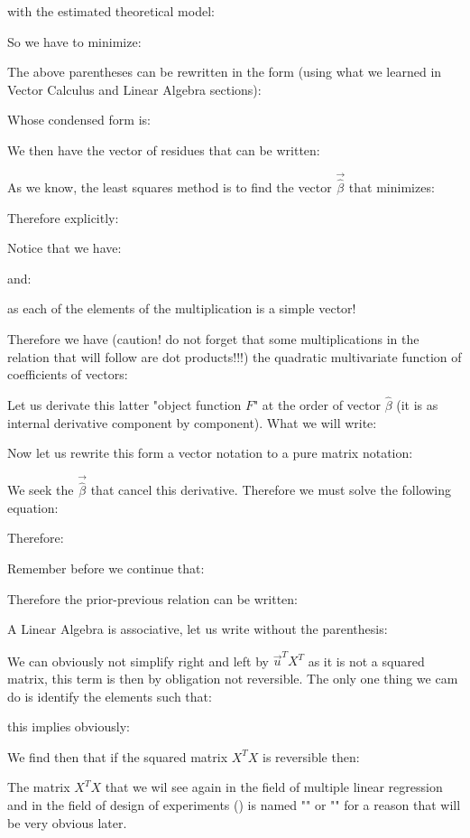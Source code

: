 	with the estimated theoretical model:
	
	So we have to minimize:
	
	The above parentheses can be rewritten in the form (using what we learned in Vector Calculus and Linear Algebra sections):
	
	Whose condensed form is:
	
	We then have the vector of residues that can be written:
	
	As we know, the least squares method is to find the vector $\vec{\hat{\beta}}$ that minimizes:
		
	Therefore explicitly:
	
	Notice that we have:
	
	and:
	
	as each of the elements of the multiplication is a simple vector!
	
	Therefore we have (caution! do not forget that some multiplications in the relation that will follow are dot products!!!) the quadratic multivariate function of coefficients of vectors:
	
	Let us derivate this latter "object function $F$" at the order of vector $\hat{\beta}$ (it is as internal derivative component by component). What we will write:
	
	Now let us rewrite this form a vector notation to a pure matrix notation:
	
	We seek the $\vec{\hat{\beta}}$ that cancel this derivative. Therefore we must solve the following equation:
	
	Therefore:
	
	Remember before we continue that:
	
	Therefore the prior-previous relation can be written:
	
	A Linear Algebra is associative, let us write without the parenthesis:
	
	We can obviously not simplify right and left by $\vec{u}^TX^T$ as it is not a squared matrix, this term is then by obligation not reversible. The only one thing we cam do is identify the elements such that:
	
	this implies obviously:
	
	We find then that if the squared matrix $X^TX$ is reversible then:
	
	The matrix $X^TX$ that we wil see again in the field of multiple linear regression and in the field of design of experiments () is named "" or "" for a reason that will be very obvious later.
	

